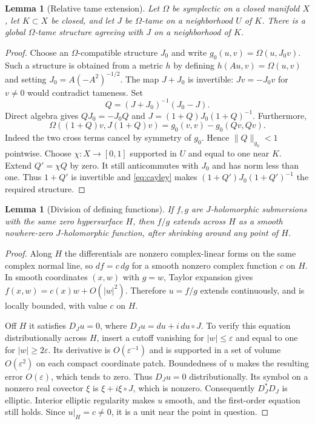 \documentclass[11pt]{article}
\newtheorem{lemma}[theorem]{Lemma}
\theoremstyle{definition}
\theoremstyle{remark}
\begin{document}
\begin{lemma}[Relative tame extension]\label{lem:extension}
Let $\Omega$ be symplectic on a closed manifold $X$, let $K\subset X$ be closed, and let $J$ be $\Omega$-tame on a neighborhood $U$ of $K$. There is a global $\Omega$-tame structure agreeing with $J$ on a neighborhood of $K$.
\end{lemma}
\begin{proof}
Choose an $\Omega$-compatible structure $J_0$ and write
$g_0(u,v)=\Omega(u,J_0v)$. Such a structure is obtained from a metric $h$ by defining $h(Au,v)=\Omega(u,v)$ and setting
$J_0=A(-A^2)^{-1/2}$.
The map $J+J_0$ is invertible: $Jv=-J_0v$ for $v\ne0$ would contradict tameness. Set
\[
 Q=(J+J_0)^{-1}(J_0-J).
\]
Direct algebra gives $QJ_0=-J_0Q$ and
$J=(1+Q)J_0(1+Q)^{-1}$. Furthermore,
\begin{equation}\label{eq:cayley}
 \Omega((1+Q)v,J(1+Q)v)=g_0(v,v)-g_0(Qv,Qv).
\end{equation}
Indeed the two cross terms cancel by symmetry of $g_0$. Hence $\|Q\|_{g_0}<1$ pointwise. Choose $\chi:X\to[0,1]$ supported in $U$ and equal to one near $K$. Extend $Q'=\chi Q$ by zero. It still anticommutes with $J_0$ and has norm less than one. Thus $1+Q'$ is invertible and \eqref{eq:cayley} makes
$(1+Q')J_0(1+Q')^{-1}$ the required structure.
\end{proof}

\begin{lemma}[Division of defining functions]\label{lem:division}
If $f,g$ are $J$-holomorphic submersions with the same zero hypersurface $H$, then $f/g$ extends across $H$ as a smooth nowhere-zero $J$-holomorphic function, after shrinking around any point of $H$.
\end{lemma}
\begin{proof}
Along $H$ the differentials are nonzero complex-linear forms on the same complex normal line, so $df=c\,dg$ for a smooth nonzero complex function $c$ on $H$. In smooth coordinates $(x,w)$ with $g=w$, Taylor expansion gives
$f(x,w)=c(x)w+O(|w|^2)$. Therefore $u=f/g$ extends continuously, and is locally bounded, with value $c$ on $H$.

Off $H$ it satisfies $D_Ju=0$, where $D_Ju=du+i\,du\circ J$. To verify this equation distributionally across $H$, insert a cutoff vanishing for $|w|\leq\varepsilon$ and equal to one for $|w|\geq2\varepsilon$. Its derivative is $O(\varepsilon^{-1})$ and is supported in a set of volume $O(\varepsilon^2)$ on each compact coordinate patch. Boundedness of $u$ makes the resulting error $O(\varepsilon)$, which tends to zero. Thus $D_Ju=0$ distributionally. Its symbol on a nonzero real covector $\xi$ is $\xi+i\xi\circ J$, which is nonzero. Consequently $D_J^*D_J$ is elliptic. Interior elliptic regularity makes $u$ smooth, and the first-order equation still holds. Since $u|_H=c\ne0$, it is a unit near the point in question.
\end{proof}
\end{document}
